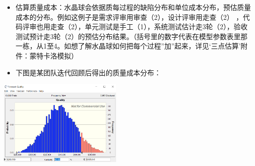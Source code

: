 \begin{itemize}
\tightlist
\item
  估算质量成本：水晶球会依据质每过程的缺陷分布和单位成本分布，预估质量成本的分布。例如这例子是需求评审用审查（2），设计评审用走查（2） ，代码评审也用走查（2），单元测试是手工（1），系统测试估计走3轮（2），验收测试预计走3轮（2）的预估分布结果。（括号里的数字代表在模型参数表里那一栋，从1至4。如想了解水晶球如何把每个过程”加”起来，详见‘三点估算’附件：蒙特卡洛模拟）
\end{itemize}

\begin{itemize}
\tightlist
\item
  下图是某团队迭代回顾后得出的质量成本分布：
\end{itemize}

\includegraphics[width=6cm]{StartQUA.PNG}
